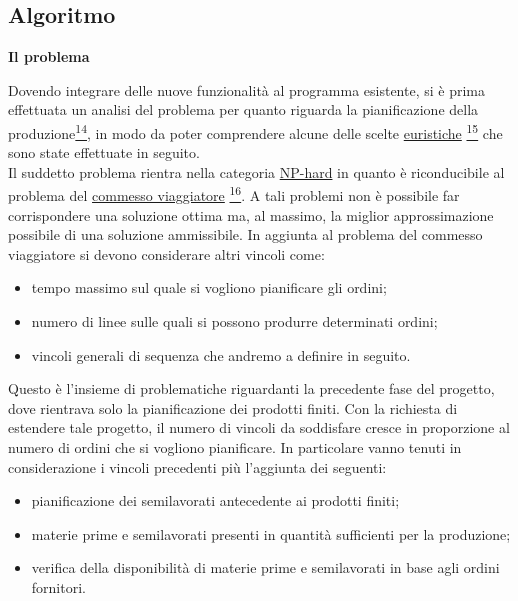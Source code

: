 \subsection{Algoritmo}

\textbf{Il problema}

Dovendo integrare delle nuove funzionalità al programma esistente, si è prima effettuata un analisi del problema per quanto riguarda la pianificazione della produzione\hyperref[slide0]{\textsuperscript{14}},
in modo da poter comprendere alcune delle scelte \hyperref[Euristica]{euristiche\glo} \hyperref[slide]{\textsuperscript{15}} che sono state effettuate in seguito.\\
Il suddetto problema rientra nella categoria \hyperref[Np-hard]{NP-hard\glo} in quanto è riconducibile al problema del \hyperref[Commesso viaggiatore]{commesso viaggiatore\glo} \hyperref[commesso]{\textsuperscript{16}}. A tali problemi non è possibile far corrispondere
una soluzione ottima ma, al massimo, la miglior approssimazione possibile di una soluzione ammissibile. In aggiunta al problema del commesso viaggiatore si devono considerare
altri vincoli come: 
\begin{itemize}
    \item tempo massimo sul quale si vogliono pianificare gli ordini;
    \item numero di linee sulle quali si possono produrre determinati ordini;
    \item vincoli generali di sequenza che andremo a definire in seguito.
\end{itemize}

Questo è l'insieme di problematiche riguardanti la precedente fase del progetto, dove rientrava solo la pianificazione dei prodotti finiti.
Con la richiesta di estendere tale progetto, il numero di vincoli da soddisfare cresce in proporzione al numero di ordini che si vogliono pianificare.
In particolare vanno tenuti in considerazione i vincoli precedenti più l'aggiunta dei seguenti:

\begin{itemize}
    \item pianificazione dei semilavorati antecedente ai prodotti finiti;
    \item materie prime e semilavorati presenti in quantità sufficienti per la produzione;
    \item verifica della disponibilità di materie prime e semilavorati in base agli ordini fornitori.
\end{itemize}


